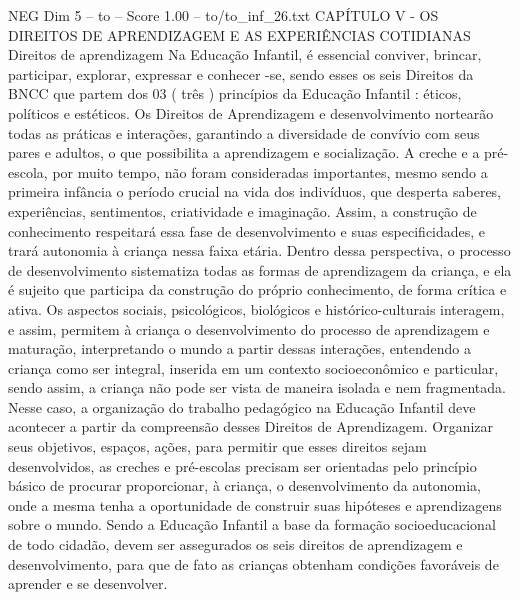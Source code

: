 \begin{textsample}{NEG Dim 5 – to – Score 1.00 – to/to\_inf\_26.txt}  \label{ex:f5_neg_268}
CAPÍTULO V - OS DIREITOS DE APRENDIZAGEM E AS EXPERIÊNCIAS COTIDIANAS Direitos de aprendizagem Na Educação Infantil, é essencial conviver, brincar, participar, explorar, expressar e conhecer -se, sendo esses os seis Direitos da BNCC que partem dos 03 ( três ) princípios da Educação Infantil : éticos, políticos e estéticos.
Os Direitos de Aprendizagem e desenvolvimento nortearão todas as práticas e interações, garantindo a diversidade de convívio com seus pares e adultos, o que possibilita a aprendizagem e socialização.
A creche e a pré-escola, por muito tempo, não foram consideradas importantes, mesmo sendo a primeira infância o período crucial na vida dos indivíduos, que desperta saberes, experiências, sentimentos, criatividade e imaginação.
Assim, a construção de conhecimento respeitará essa fase de desenvolvimento e suas especificidades, e trará autonomia à criança nessa faixa etária.
Dentro dessa perspectiva, o processo de desenvolvimento sistematiza todas as formas de aprendizagem da criança, e ela é sujeito que participa da construção do próprio conhecimento, de forma crítica e ativa.
Os aspectos sociais, psicológicos, biológicos e histórico-culturais interagem, e assim, permitem à criança o desenvolvimento do processo de aprendizagem e maturação, interpretando o mundo a partir dessas interações, entendendo a criança como ser integral, inserida em um contexto socioeconômico e particular, sendo assim, a criança não pode ser vista de maneira isolada e nem fragmentada.
Nesse caso, a organização do trabalho pedagógico na Educação Infantil deve acontecer a partir da compreensão desses Direitos de Aprendizagem.
Organizar seus objetivos, espaços, ações, para permitir que esses direitos sejam desenvolvidos, as creches e pré-escolas precisam ser orientadas pelo princípio básico de procurar proporcionar, à criança, o desenvolvimento da autonomia, onde a mesma tenha a oportunidade de construir suas hipóteses e aprendizagens sobre o mundo.
Sendo a Educação Infantil a base da formação socioeducacional de todo cidadão, devem ser assegurados os seis direitos de aprendizagem e desenvolvimento, para que de fato as crianças obtenham condições favoráveis de aprender e se desenvolver.

\end{textsample}
